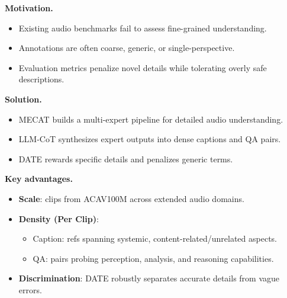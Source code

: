 \textbf{Motivation.}
\begin{itemize}
    \item Existing audio benchmarks fail to assess fine-grained understanding.
    \item Annotations are often coarse, generic, or single-perspective.
    \item Evaluation metrics penalize novel details while tolerating overly safe descriptions.
\end{itemize}

\vspace{0.25cm}
\textbf{Solution.}
\begin{itemize}
    \item MECAT builds a multi-expert pipeline for detailed audio understanding.
    \item LLM-CoT synthesizes expert outputs into dense captions and QA pairs.
    \item DATE rewards specific details and penalizes generic terms.
\end{itemize}

\vspace{0.25cm}
\textbf{Key advantages.}
\begin{itemize}
    \item \textbf{Scale}:  clips from ACAV100M across extended audio domains.
    \item \textbf{Density (Per Clip)}:
    \begin{itemize}
        \item Caption:  refs spanning systemic, content-related/unrelated aspects.
        \item QA:  pairs probing perception, analysis, and reasoning capabilities.
    \end{itemize}
    \item \textbf{Discrimination}: DATE robustly separates accurate details from vague errors.
\end{itemize}
